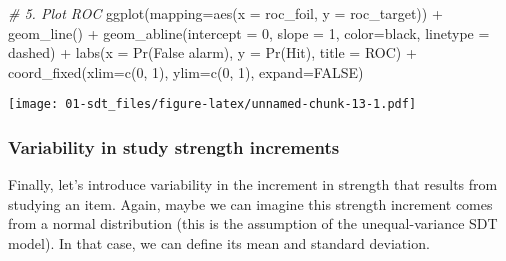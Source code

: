 \documentclass[
]{book}
\newenvironment{Shaded}{\begin{snugshade}}{\end{snugshade}}
\newcommand{\AttributeTok}[1]{\textcolor[rgb]{0.77,0.63,0.00}{#1}}
\newcommand{\CommentTok}[1]{\textcolor[rgb]{0.56,0.35,0.01}{\textit{#1}}}
\newcommand{\ConstantTok}[1]{\textcolor[rgb]{0.00,0.00,0.00}{#1}}
\newcommand{\DecValTok}[1]{\textcolor[rgb]{0.00,0.00,0.81}{#1}}
\newcommand{\FunctionTok}[1]{\textcolor[rgb]{0.00,0.00,0.00}{#1}}
\newcommand{\NormalTok}[1]{#1}
\newcommand{\SpecialCharTok}[1]{\textcolor[rgb]{0.00,0.00,0.00}{#1}}
\newcommand{\StringTok}[1]{\textcolor[rgb]{0.31,0.60,0.02}{#1}}
\begin{document}
\begin{Shaded}
\begin{Highlighting}[]
\CommentTok{\# 5. Plot ROC}
\FunctionTok{ggplot}\NormalTok{(}\AttributeTok{mapping=}\FunctionTok{aes}\NormalTok{(}\AttributeTok{x =}\NormalTok{ roc\_foil, }\AttributeTok{y =}\NormalTok{ roc\_target)) }\SpecialCharTok{+}
    \FunctionTok{geom\_line}\NormalTok{() }\SpecialCharTok{+}
    \FunctionTok{geom\_abline}\NormalTok{(}\AttributeTok{intercept =} \DecValTok{0}\NormalTok{, }\AttributeTok{slope =} \DecValTok{1}\NormalTok{, }\AttributeTok{color=}\StringTok{\textquotesingle{}black\textquotesingle{}}\NormalTok{, }\AttributeTok{linetype =} \StringTok{\textquotesingle{}dashed\textquotesingle{}}\NormalTok{) }\SpecialCharTok{+}
    \FunctionTok{labs}\NormalTok{(}\AttributeTok{x =} \StringTok{\textquotesingle{}Pr(False alarm)\textquotesingle{}}\NormalTok{, }\AttributeTok{y =} \StringTok{\textquotesingle{}Pr(Hit)\textquotesingle{}}\NormalTok{, }\AttributeTok{title =} \StringTok{\textquotesingle{}ROC\textquotesingle{}}\NormalTok{) }\SpecialCharTok{+}
    \FunctionTok{coord\_fixed}\NormalTok{(}\AttributeTok{xlim=}\FunctionTok{c}\NormalTok{(}\DecValTok{0}\NormalTok{, }\DecValTok{1}\NormalTok{), }\AttributeTok{ylim=}\FunctionTok{c}\NormalTok{(}\DecValTok{0}\NormalTok{, }\DecValTok{1}\NormalTok{), }\AttributeTok{expand=}\ConstantTok{FALSE}\NormalTok{)}
\end{Highlighting}
\end{Shaded}

\texttt{[image: 01-sdt\_files/figure-latex/unnamed-chunk-13-1.pdf]}

\hypertarget{variability-in-study-strength-increments}{%
\subsubsection{Variability in study strength increments}\label{variability-in-study-strength-increments}}

Finally, let's introduce variability in the increment in strength that results from studying an item. Again, maybe we can imagine this strength increment comes from a normal distribution (this is the assumption of the unequal-variance SDT model). In that case, we can define its mean and standard deviation.
\end{document}
